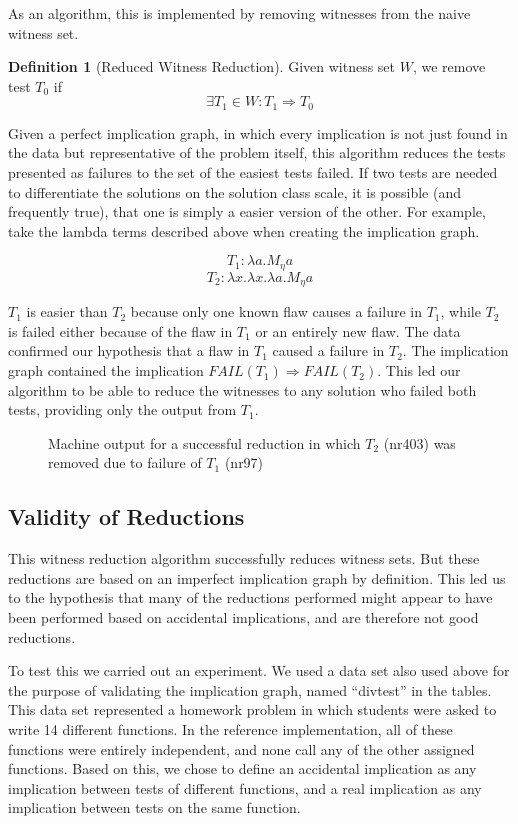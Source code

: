 \documentclass[11pt,twoside]{article}
\newcommand\fail{\mathit{FAIL}}
\theoremstyle{definition}
\newtheorem{defn}{Definition}
\begin{document}
As an algorithm, this is implemented by removing witnesses from the naive witness set.
\begin{defn}[Reduced Witness Reduction]
Given witness set $W$, we remove test $T_0$ if
$$\exists T_1 \in W : T_1 \Rightarrow T_0$$
\end{defn}

Given a perfect implication graph, in which every implication is not just found in the data but representative of the problem itself, this algorithm reduces the tests presented as failures to the set of the easiest tests failed. If two tests are needed to differentiate the solutions on the solution class scale, it is possible (and frequently true), that one is simply a easier version of the other. For example, take the lambda terms described above when creating the implication graph. 

$$T_1 : \lambda a.M_\eta a$$
$$T_2 : \lambda x.\lambda x.\lambda a.M_\eta a$$

$T_1$ is easier than $T_2$ because only one known flaw causes a failure in $T_1$, while $T_2$ is failed either because of the flaw in $T_1$ or an entirely new flaw. The data confirmed our hypothesis that a flaw in $T_1$ caused a failure in $T_2$. The implication graph contained the implication $\fail(T_1) \Rightarrow \fail(T_2)$. This led our algorithm to be able to reduce the witnesses to any solution who failed both tests, providing only the output from $T_1$.

\begin{figure}

\caption{Machine output for a successful reduction in which $T_2$ (nr403) was removed due to failure of $T_1$ (nr97)}
\end{figure}

\subsection{Validity of Reductions}

This witness reduction algorithm successfully reduces witness sets. But these reductions are based on an imperfect implication graph by definition. This led us to the hypothesis that many of the reductions performed might appear to have been performed based on accidental implications, and are therefore not good reductions.

To test this we carried out an experiment. We used a data set also used above for the purpose of validating the implication graph, named ``divtest'' in the tables. This data set represented a homework problem in which students were asked to write 14 different functions. In the reference implementation, all of these functions were entirely independent, and none call any of the other assigned functions. Based on this, we chose to define an accidental implication as any implication between tests of different functions, and a real implication as any implication between tests on the same function.
\end{document}
